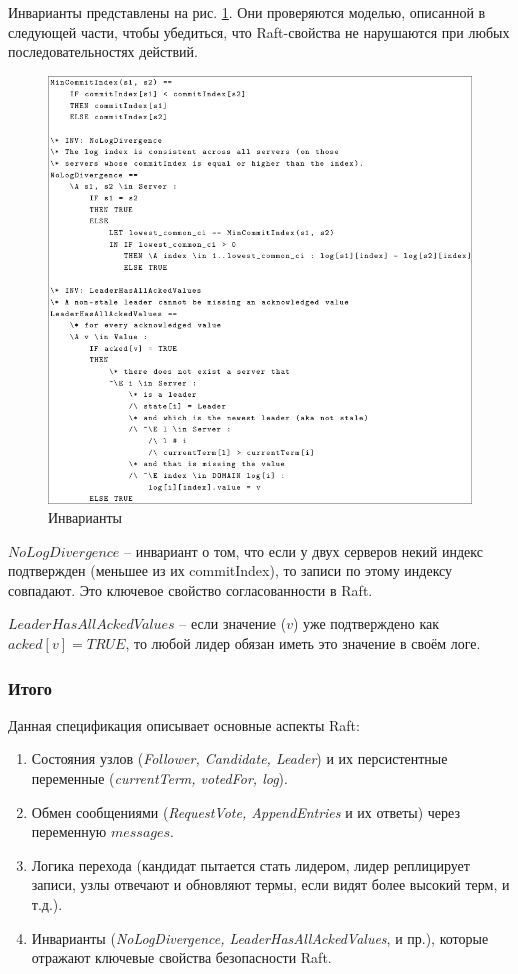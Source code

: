 Инварианты представлены на рис. \ref{fig:tla-08}. Они проверяются моделью, описанной
в следующей части, чтобы убедиться, что Raft-свойства не нарушаются при любых
последовательностях действий.

\begin{figure}
  \centering
  \includegraphics[scale=0.4]{inc/tla-08.png}
  \caption{Инварианты}
  \label{fig:tla-08}
\end{figure}

$NoLogDivergence$ – инвариант о том, что если у двух серверов некий индекс
подтвержден (меньшее из их commitIndex), то записи по этому индексу совпадают.
Это ключевое свойство согласованности в Raft.

$LeaderHasAllAckedValues$ – если значение ($v$) уже подтверждено как
$acked[v] = TRUE$, то любой лидер обязан иметь это значение в своём логе.

\subsubsection*{Итого}

Данная спецификация описывает основные аспекты Raft:

\begin{enumerate}
    \item Состояния узлов (\textit{Follower, Candidate, Leader}) и их персистентные
        переменные (\textit{currentTerm, votedFor, log}).
    \item Обмен сообщениями (\textit{RequestVote, AppendEntries} и их ответы) через
        переменную $messages$.
    \item Логика перехода (кандидат пытается стать лидером, лидер реплицирует
        записи, узлы отвечают и обновляют термы, если видят более высокий терм,
        и т.д.).
    \item Инварианты (\textit{NoLogDivergence, LeaderHasAllAckedValues}, и пр.),
        которые отражают ключевые свойства безопасности Raft.
\end{enumerate}

